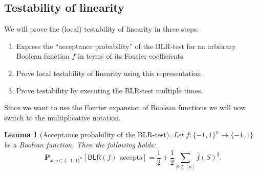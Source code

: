 \documentclass[a4paper]{article}
\newcommand{\prob}{\mathbf{P}}
\newcommand{\nset}{[n]}
\theoremstyle{plain}
\newtheorem{lemma}{Lemma}
\theoremstyle{definition}
\theoremstyle{remark}
\begin{document}
\subsection{Testability of linearity}
\label{sec:test-line}

We will prove the (local) testability of linearity in three steps: 
\begin{enumerate}
\item Express the ``acceptance probability'' of the \textsf{BLR}-test
  for an arbitrary Boolean function \(f\) in terms of its Fourier
  coefficients.
\item Prove local testability of linearity using this representation.
\item Prove testability by executing the \textsf{BLR}-test multiple
  times. 
\end{enumerate}

\noindent Since we want to use the Fourier expansion of Boolean
functions we will now switch to the multiplicative notation. 

\begin{lemma}[Acceptance probability of the \textsf{BLR}-test] \label{lem:1}
  Let \(f: \{-1,1\}^n \rightarrow \{-1,1\}\) be a Boolean function. Then
  the following holds: 
  \begin{equation}
    \label{eq:2}
    \prob_{x,y \in \{-1,1\}^n}[\textsf{BLR}(f) \text{ accepts}] = \frac{1}{2} + \frac{1}{2}\sum_{S\subseteq \nset}\hat{f}(S)^3.
  \end{equation}
\end{lemma}
\end{document}
